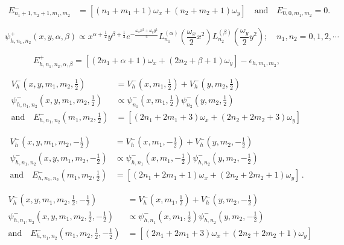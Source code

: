 \documentclass[12pt]{article}
\begin{document}
\begin{align}
 E_{n_1+1,n_2+1,m_1,m_2}^-&=\left[\left(n_1+m_1+1\right)\omega_x
+\left(n_2+m_2+1\right)\omega_y \right] \quad \text{and}
\quad E_{0,0,m_1,m_2}^-=0.
\end{align}

\begin{equation}\label{2DHLO:psi+}
    \psi_{h,n_1,n_2}^+(x,y,\alpha,\beta)\propto  x^{\alpha +\frac{1}{2}}y^{\beta +\frac{1}{2}} e^{-\frac{\omega_xx^2+\omega_y y^2}{4}} L_{n_1}^{(\alpha) }\left(\frac{\omega_x}{2} x^2\right)L_{n_2}^{(\beta)}\left(\frac{\omega_y}{2} y^2\right); \quad n_1, n_2=0,1,2,\cdots
\end{equation} 


\begin{equation}\label{2DHLO:E+}
    E^+_{h,n_1,n_2,\alpha,\beta}=[(2n_1+\alpha+1)\omega_x+(2n_2+\beta+1)\omega_y]-\epsilon_{h,m_1,m_2},
\end{equation}

\begin{align}
V_h^-(x,y,m_1,m_2,\frac{1}{2}) &= V_h^-(x,m_1,\frac{1}{2}) + V_h^-(y,m_2,\frac{1}{2}) \\
\psi_{h,n_1,n_2}^-(x,y,m_1,m_2,\frac{1}{2})&\propto\psi^-_{n_1}(x,m_1,\frac{1}{2})\psi^-_{n_2}(y,m_2,\frac{1}{2})\\
\mbox{and} \quad	
E_{h,n_1,n_2}^-(m_1,m_2,\frac{1}{2})&=\left[\left(2n_1+2m_1+3\right)\omega_x 
+\left(2n_2+2m_2+3\right) \omega_y \right]\,
\end{align}

\begin{align}
    V_h^-(x,y,m_1,m_2,-\frac{1}{2}) &= V_h^-(x,m_1,-\frac{1}{2}) + V_h^-(y,m_2,-\frac{1}{2}) \\
    \psi_{h,n_1,n_2}^-(x,y,m_1,m_2,-\frac{1}{2})&\propto\psi^-_{h,n_1}(x,m_1,-\frac{1}{2})\psi^-_{h,n_2}(y,m_2,-\frac{1}{2})\\
    \mbox{and} \quad	
E_{h,n_1,n_2}^-(m_1,m_2,\frac{1}{2})&=\left[\left(2n_1+2m_1+1\right)\omega_x
+\left(2n_2+2m_2+1\right) \omega_y \right]\,.
\end{align}

\begin{align}
    V_h^-(x,y,m_1,m_2,\frac{1}{2},-\frac{1}{2}) &= V_h^-(x,m_1,\frac{1}{2}) + V_h^-(y,m_2,-\frac{1}{2}) \\
    \psi_{h,n_1,n_2}^-(x,y,m_1,m_2,\frac{1}{2},-\frac{1}{2})&\propto\psi^-_{h,n_1}(x,m_1,\frac{1}{2})\psi^-_{h,n_2}(y,m_2,-\frac{1}{2})\\
    \mbox{and} \quad	
E_{h,n_1,n_2}^-(m_1,m_2,\frac{1}{2},-\frac{1}{2})&=\left[\left(2n_1+2m_1+3\right)\omega_x +\left(2n_2+2m_2+1\right)\omega_y\right]\,
\end{align}
\end{document}
